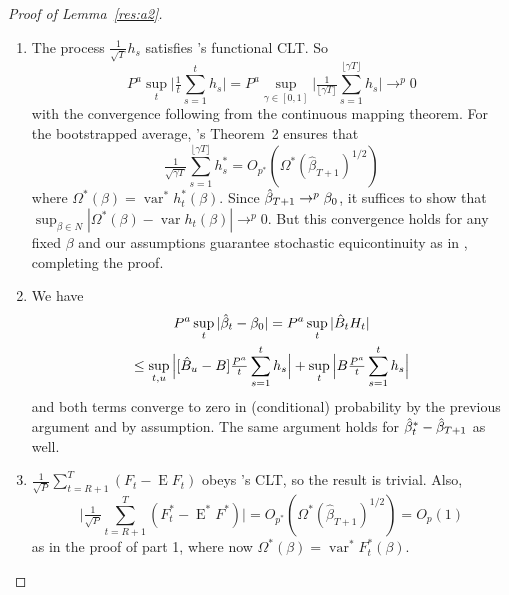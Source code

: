 \documentclass[12pt,fleqn]{article}
\newcommand\citepos[2][]{\citeauthor{#2}'s \citeyearpar[#1]{#2}}
\theoremstyle{definition}
\DeclareMathOperator{\E}{E}
\DeclareMathOperator{\var}{var}
\newcommand{\btrue}[1][]{\if#1*\hat\beta_{T+1}\else\beta_0\fi}
\newcommand{\clt}{CLT}
\begin{document}
\begin{proof}[Proof of Lemma~\ref{res:a2}]
  \begin{enumerate}
  \item The process $\tfrac{1}{\sqrt{T}} h_{s}$ satisfies
    \citepos[Theorem 3.1]{JoD:00b} functional \clt.  So
    \begin{equation}
      P^a \sup_t \Big| \tfrac1t \sum_{s=1}^t h_{s} \Big| =
      P^a \sup_{\gamma \in [0,1]} \Big| \tfrac{1}{\lfloor \gamma
        T\rfloor} \sum_{s=1}^{\lfloor \gamma T \rfloor} h_{s} \Big| \to^{p} 0
    \end{equation}
    with the convergence following from the continuous mapping
    theorem.  For the bootstrapped average, \citepos{Cal:13}
    Theorem~2 ensures that
    \begin{equation}
      \tfrac{1}{\sqrt{\gamma
          T}} \sum_{s=1}^{\lfloor \gamma T \rfloor} h_{s}^*
      = O_{p^*}(\Omega^*(\hat\beta_{T+1})^{1/2})
    \end{equation}
    where $\Omega^*(\beta) = \var^* h_t^*(\beta)$.  Since
    $\hat\beta_{T+1} \to^p \btrue$, it suffices to show that
    $\sup_{\beta \in N} | \Omega^*(\beta) - \var h_t(\beta) | \to^p
    0$.  But this convergence holds for any fixed $\beta$ and our
    assumptions guarantee stochastic equicontinuity as in
    \citet{JoD:00} \citep[also see][]{Dav:94}, completing the proof.

  \item We have
    \begin{multline}
      P^a \sup_t | \hat{\beta}_t - \btrue | = P^a \sup_t |\hat{B}_{t}
      H_{t}| \\ \leq \sup_{t,u} \Big| [ \hat{B}_u - B]
      \tfrac{P^a}{t} \sum_{s=1}^t h_{s} \Big| + \sup_{t} \Big|
      B \tfrac{P^a}{t} \sum_{s=1}^t h_{s} \Big|
    \end{multline}
    and both terms converge to zero in (conditional) probability by
    the previous argument and by assumption.  The same argument holds
    for $\hat{\beta}_t^{*} - \btrue[*]$ as well.
  \item $\tfrac{1}{\sqrt{P}} \sum_{t=R+1}^T (F_t - \E F_t)$ obeys
    \citepos{Jon:97} \clt, so the result is trivial.  Also,
   \begin{equation}
     \Big\lvert\tfrac{1}{\sqrt{P}} \sum_{t=R+1}^T 
     ( F_t^* - \E^* F^*)\Big\rvert = O_{p^*}(\Omega^*(\hat\beta_{T+1})^{1/2}) = O_p(1)
    \end{equation}
    as in the proof of part 1, where now $\Omega^*(\beta) = \var^* F_t^*(\beta)$.
  \end{enumerate}
\end{proof}
\end{document}
